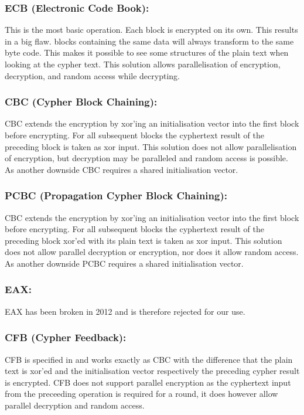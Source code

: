 \subsubsection{ECB (Electronic Code Book):} This is the most basic operation. Each block is encrypted on its own. This results in a big flaw. blocks containing the same data will always transform to the same byte code. This makes it possible to see some structures of the plain text when looking at the cypher text. This solution allows parallelisation of encryption, decryption, and random access while decrypting.

\subsubsection{CBC (Cypher Block Chaining):}  CBC extends the encryption by xor'ing an initialisation vector into the first block before encrypting. For all subsequent blocks the cyphertext result of the preceding block is taken as xor input. This solution does not allow parallelisation of encryption, but decryption may be paralleled and random access is possible. As another downside CBC requires a shared initialisation vector. 

\subsubsection{PCBC (Propagation Cypher Block Chaining):}  CBC extends the encryption by xor'ing an initialisation vector into the first block before encrypting. For all subsequent blocks the cyphertext result of the preceding block xor'ed with its plain text is taken as xor input. This solution does not allow parallel decryption or encryption, nor does it allow random access. As another downside PCBC requires a shared initialisation vector. 

\subsubsection{EAX:} EAX has been broken in 2012\cite{minematsu2013attacks} and is therefore rejected for our use.

\subsubsection{CFB (Cypher Feedback):} CFB is specified in \cite{dworkin2001recommendation} and works exactly as CBC with the difference that the plain text is xor'ed and the initialisation vector respectively the preceding cypher result is encrypted. CFB does not support parallel encryption as the cyphertext input from the preceeding operation is required for a round, it does however allow parallel decryption and random access.

